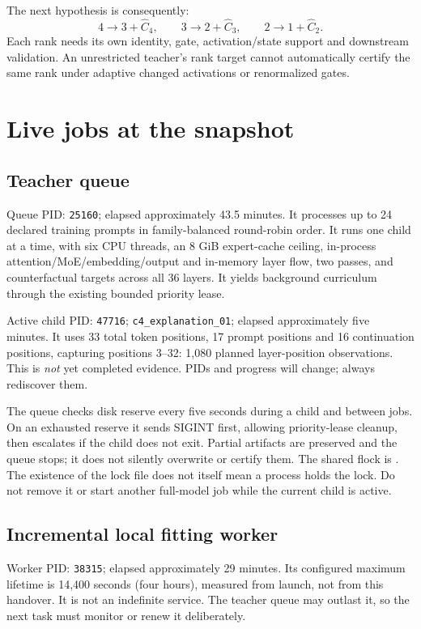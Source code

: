 \documentclass[11pt,a4paper]{article}
\begin{document}
The next hypothesis is consequently:
\[
 4\rightarrow3+\widehat C_4,\qquad
 3\rightarrow2+\widehat C_3,\qquad
 2\rightarrow1+\widehat C_2.
\]
Each rank needs its own identity, gate, activation/state support and downstream
validation. An unrestricted teacher's rank target cannot automatically certify
the same rank under adaptive changed activations or renormalized gates.

\section{Live jobs at the snapshot}
\subsection{Teacher queue}
Queue PID: \texttt{25160}; elapsed approximately 43.5 minutes. It processes up
to 24 declared training prompts in family-balanced round-robin order. It runs
one child at a time, with six CPU threads, an 8 GiB expert-cache ceiling,
in-process attention/MoE/embedding/output and in-memory layer flow, two passes,
and counterfactual targets across all 36 layers. It yields background
curriculum through the existing bounded priority lease.

Active child PID: \texttt{47716}; \texttt{c4\_explanation\_01}; elapsed
approximately five minutes. It uses 33 total token positions, 17 prompt
positions and 16 continuation positions, capturing positions 3--32:
1,080 planned layer-position observations. This is \emph{not} yet completed
evidence. PIDs and progress will change; always rediscover them.

The queue checks disk reserve every five seconds during a child and between
jobs. On an exhausted reserve it sends SIGINT first, allowing priority-lease
cleanup, then escalates if the child does not exit. Partial artifacts are
preserved and the queue stops; it does not silently overwrite or certify them.
The shared flock is . The existence
of the lock file does not itself mean a process holds the lock. Do not remove
it or start another full-model job while the current child is active.

\subsection{Incremental local fitting worker}
Worker PID: \texttt{38315}; elapsed approximately 29 minutes. Its configured
maximum lifetime is 14,400 seconds (four hours), measured from launch, not
from this handover. It is not an indefinite service. The teacher queue may
outlast it, so the next task must monitor or renew it deliberately.
\end{document}
